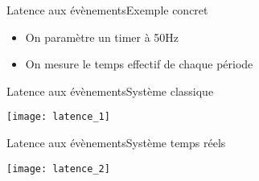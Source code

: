 \begin{frame}{Latence aux évènements}{Exemple concret}
  \begin{itemize}
  \item On paramètre un timer à 50Hz
  \item On mesure le temps effectif de chaque période
  \end{itemize}
\end{frame}

\begin{frame}{Latence aux évènements}{Système classique}
  \begin{center}
    \texttt{[image: latence\_1]}
  \end{center}
\end{frame}

\begin{frame}{Latence aux évènements}{Système temps réels}
  \begin{center}
    \texttt{[image: latence\_2]}
  \end{center}
\end{frame}

